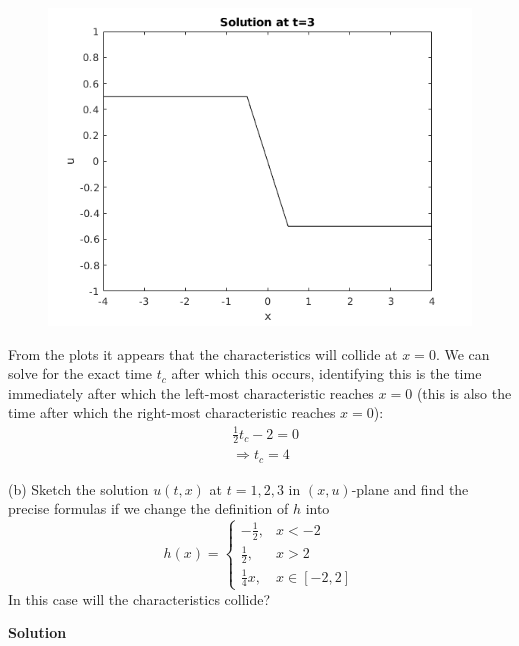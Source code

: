 \documentclass{article}
\begin{document}
%
\begin{figure}[H]
    \centering
    \includegraphics[width=12cm]{q2pa-3}
\end{figure}
%
From the plots it appears that the characteristics will collide at $x =
0$. We can solve for the exact time $t_c$ after which this occurs,
identifying this is the time immediately after which the left-most
characteristic reaches $x = 0$ (this is also the time after which the
right-most characteristic reaches $x = 0$):
%
\begin{align*}
    &\frac{1}{2} t_c - 2 = 0 \\
    &\Rightarrow t_c = 4
\end{align*}

\vspace{5mm}

(b) Sketch the solution $u(t, x)$ at $t = 1, 2, 3$ in $(x, u)$-plane and
find the precise formulas if we change the definition of $h$ into
%
\begin{equation*}
    h(x) =
        \begin{cases}
            -\frac{1}{2}, & x < -2 \\
            \frac{1}{2}, & x > 2 \\
            \frac{1}{4} x, & x \in [-2, 2]
        \end{cases}
\end{equation*}
%
In this case will the characteristics collide?

\textbf{Solution}
\end{document}
